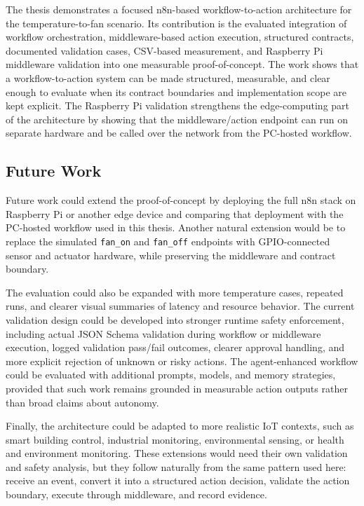 The thesis demonstrates a focused n8n-based workflow-to-action architecture for the temperature-to-fan scenario. Its contribution is the evaluated integration of workflow orchestration, middleware-based action execution, structured contracts, documented validation cases, CSV-based measurement, and Raspberry Pi middleware validation into one measurable proof-of-concept.
The work shows that a workflow-to-action system can be made structured, measurable, and clear enough to evaluate when its contract boundaries and implementation scope are kept explicit. The Raspberry Pi validation strengthens the edge-computing part of the architecture by showing that the middleware/action endpoint can run on separate hardware and be called over the network from the PC-hosted workflow.



\subsection{Future Work}\label{subsec:future-work}

Future work could extend the proof-of-concept by deploying the full n8n stack on Raspberry Pi or another edge device and comparing that deployment with the PC-hosted workflow used in this thesis. Another natural extension would be to replace the simulated \texttt{fan\_on} and \texttt{fan\_off} endpoints with GPIO-connected sensor and actuator hardware, while preserving the middleware and contract boundary.

The evaluation could also be expanded with more temperature cases, repeated runs, and clearer visual summaries of latency and resource behavior. The current validation design could be developed into stronger runtime safety enforcement, including actual JSON Schema validation during workflow or middleware execution, logged validation pass/fail outcomes, clearer approval handling, and more explicit rejection of unknown or risky actions. The agent-enhanced workflow could be evaluated with additional prompts, models, and memory strategies, provided that such work remains grounded in measurable action outputs rather than broad claims about autonomy.

Finally, the architecture could be adapted to more realistic IoT contexts, such as smart building control, industrial monitoring, environmental sensing, or health and environment monitoring. These extensions would need their own validation and safety analysis, but they follow naturally from the same pattern used here: receive an event, convert it into a structured action decision, validate the action boundary, execute through middleware, and record evidence.
